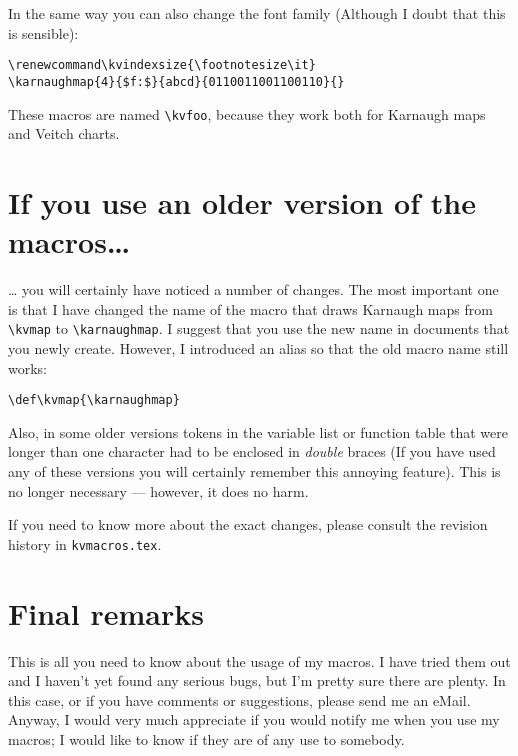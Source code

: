 \documentclass{article}
\begin{document}
\begin{center}
\renewcommand\kvindexsize{\footnotesize}
\end{center}

In the same way you can also change the font family (Although I doubt that
this is sensible): 

\begin{verbatim}
\renewcommand\kvindexsize{\footnotesize\it}
\karnaughmap{4}{$f:$}{abcd}{0110011001100110}{}
\end{verbatim}

\begin{center}
\renewcommand\kvindexsize{\footnotesize\it}
\end{center}


These macros are named \verb|\kvfoo|, because they work both for Karnaugh maps
and Veitch charts.

\section{If you use an older version of the macros\ldots}

\ldots{} you will certainly have noticed a number of changes. The most
important one is that I have changed the name of the macro that draws Karnaugh
maps from \verb|\kvmap| to \verb|\karnaughmap|. I suggest that you use the new
name in documents that you newly create. However, I introduced an alias so
that the old macro name still works:

\begin{verbatim}
\def\kvmap{\karnaughmap}
\end{verbatim}

Also, in some older versions tokens in the variable list or function table
that were longer than one character had to be enclosed in \emph{double} braces
(If you have used any of these versions you will certainly remember this
annoying  feature). This is no longer necessary   --- however, it does no
harm.

If you need to know more about the exact changes, please consult the revision
history in \verb|kvmacros.tex|.

\section{Final remarks}

This is all you need to know about the usage of my macros. I have tried them
out and I haven't yet found any serious bugs, but I'm pretty sure there are
plenty. In this case, or if you have comments or suggestions,  please send me
an eMail. Anyway, I would very much appreciate if you would notify me when you
use my macros; I would like to know if they are of any use to somebody. 
\end{document}
